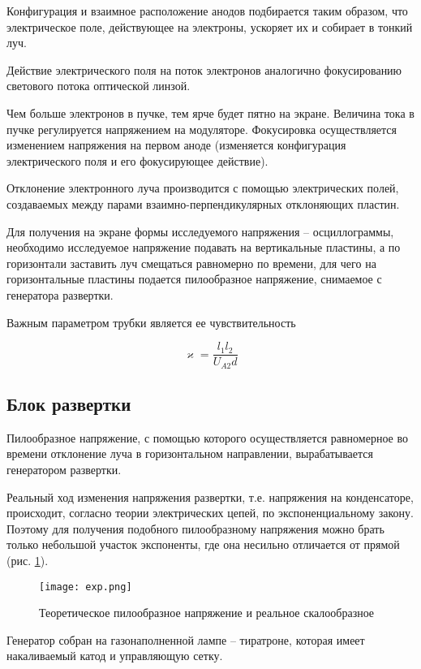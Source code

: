 Конфигурация и взаимное расположение анодов подбирается таким образом, что электрическое поле, действующее на электроны, ускоряет их и собирает в тонкий луч. 

Действие электрического поля на поток электронов аналогично фокусированию светового потока оптической линзой.

Чем больше электронов в пучке, тем ярче будет пятно на экране. Величина тока в пучке регулируется напряжением на модуляторе. Фокусировка осуществляется изменением напряжения на первом аноде (изменяется конфигурация электрического поля и его фокусирующее действие).

Отклонение электронного луча производится с помощью электрических полей, создаваемых между парами взаимно-перпендикулярных отклоняющих пластин. 

Для получения на экране формы исследуемого напряжения -- осциллограммы, необходимо исследуемое напряжение подавать на вертикальные пластины, а по горизонтали заставить луч смещаться равномерно по времени, для чего на горизонтальные пластины подается пилообразное напряжение, снимаемое с генератора развертки.

Важным параметром трубки является ее чувствительность 

\begin{equation}
	\label{f:kappa}
	\varkappa=\frac{l_1l_2}{U_{A2}d}
\end{equation}

\subsection{Блок развертки}

Пилообразное напряжение, с помощью которого осуществляется равномерное во времени отклонение луча в горизонтальном направлении, вырабатывается генератором развертки.

Реальный ход изменения напряжения развертки, т.е. напряжения на конденсаторе, происходит, согласно теории электрических цепей, по экспоненциальному закону. Поэтому для получения подобного пилообразному напряжения можно брать только небольшой участок экспоненты, где она несильно отличается от прямой (рис. \ref{fig:exp}).

\begin{figure}[H]
	\centering
	\texttt{[image: exp.png]}
	\caption{Теоретическое пилообразное напряжение и реальное скалообразное}
	\label{fig:exp}
\end{figure}

Генератор собран на газонаполненной лампе -- тиратроне, которая имеет накаливаемый катод и управляющую сетку. 

